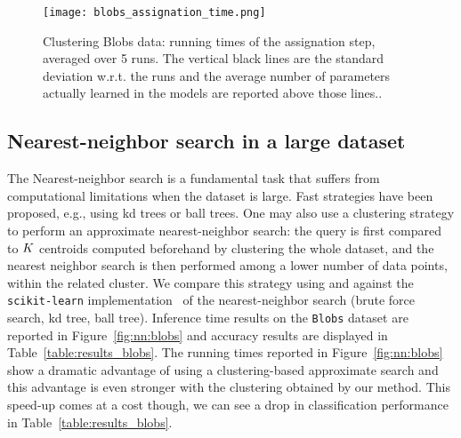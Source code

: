 
\begin{figure}[tbh]
\centering
\texttt{[image: blobs\_assignation\_time.png]}
\caption{Clustering Blobs data: running times of the assignation step, averaged over 5 runs. The vertical black lines are the standard deviation w.r.t. the runs and the average number of parameters actually learned  in the models are reported above those lines..}
\label{fig:clustering:blobs:assignation_time}
\end{figure}

\subsection{Nearest-neighbor search in a large dataset}
The Nearest-neighbor search is a fundamental task that suffers from computational limitations when the dataset is large.
Fast strategies have been proposed, e.g., using kd trees or ball trees.
One may also use a clustering strategy to perform an approximate nearest-neighbor search: the query is first compared to $K$ centroids computed beforehand by clustering the whole dataset, and the nearest neighbor search is then performed among a lower number of data points, within the related cluster.
We compare this strategy using \kmeans and \qkmeans against the \texttt{scikit-learn} implementation~\cite{Pedregosa2011Scikit} of the nearest-neighbor search (brute force search, kd tree, ball tree).
Inference time results on the \texttt{Blobs} dataset are reported in Figure~\ref{fig:nn:blobs} and accuracy results are displayed in Table~\ref{table:results_blobs}. 
The running times reported in Figure~\ref{fig:nn:blobs} show a dramatic advantage of using a clustering-based approximate search 
and this advantage is even stronger with the clustering obtained by our \qkmeans method. This speed-up comes at a cost though, we can see a drop in classification performance in Table~\ref{table:results_blobs}. 


